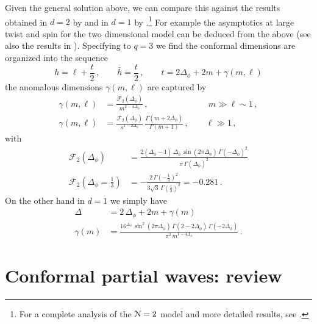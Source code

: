 \documentclass[11pt]{article}
\begin{document}
Given the general solution above, we can compare this against the results obtained in $d=2$ by \cite{Murugan:2017eto} and in $d=1$ by \cite{Anninos:2016szt}.\footnote{For a complete analysis  of the ${\cal N}=2$ model and more detailed results, see \cite{Peng:2017spg,Peng:2020euz}.} For example the asymptotics at large twist and spin for the two dimensional model can be deduced from the above (see also the results in \cite{Bulycheva:2018qcp}). Specifying to $q=3$ we find the conformal dimensions are organized into the sequence 
%
\begin{equation}
h = \ell+ \frac{t}{2}\,, \qquad  \bar{h} = \frac{t}{2}\,,  \qquad t= 2\Delta_\phi+ 2m + \gamma(m,\ell)
\end{equation}	
%
the anomalous dimensions $\gamma(m,\ell)$ are captured by 
%
\begin{equation}
\begin{split}
\gamma(m,\ell) &= \frac{\mathcal{F}_2(\Delta_\phi)}{m^{2-4\Delta_\phi}} \,, \qquad \qquad \qquad \quad m \gg \ell \sim 1 \,,  \\
\gamma(m,\ell) &= \frac{\mathcal{F}_2(\Delta_\phi)}{s^{1-2\Delta_\phi}} \, \frac{\Gamma(m+2\Delta_\phi)}{\Gamma(m+1)} \,, \qquad \ell \gg 1 \,,
\end{split}
\end{equation}	
%
with 
%
\begin{equation}
\begin{split}
\mathcal{F}_2(\Delta_\phi) &= \frac{2(\Delta_\phi -1)\, \Delta_\phi \, \sin(2\pi\Delta_\phi) \, \Gamma(-\Delta_\phi)^2}{\pi\, \Gamma(\Delta_\phi)^2}  \\
\mathcal{F}_2(\Delta_\phi = \frac{1}{3}) &= -\frac{2\, \Gamma(-\frac{1}{3})^2}{3\sqrt{3}\, \Gamma(\frac{1}{3})^2} = -0.281 \,.
\end{split}
\end{equation}	
%
On the other hand in $d=1$ we simply have 
%
\begin{equation}
\begin{split}
\Delta &= 2\, \Delta_\phi + 2m + \gamma(m) \\ 
\gamma(m) &= \frac{16^{\Delta_\phi}\, \sin^2(2\pi\Delta_\phi) \, \Gamma(2-2\Delta_\phi)\, \Gamma(-2\Delta_\phi)}{\pi^2\, m^{1-4\Delta_\phi}} \,.
\end{split}
\end{equation}	
%
\section{Conformal partial waves: review}
\label{sec:cpw}
\end{document}
